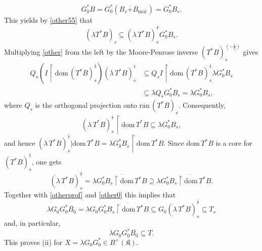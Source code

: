 \documentclass[10pt,a4paper]{amsart}
\makeatletter
\newcommand{\D}{\mathrm{dom}\,}
\newcommand{\adj}{^*}
\newcommand{\half}{^{\frac{1}{2}}}
\newcommand{\halfltsbs}{ (\lambda \,  \tstar B)^{\half}_s }
\newcommand{\halftsbs}{ ( \tstar B)^{\half}_s }
\newcommand{\inclu}{\subseteq}
\newcommand{\kk}{\mathfrak{K}}
\newcommand{\lplusk}{B^{+}(\kk)}
\newcommand{\mul}{\mathrm{mul} \, }
\renewenvironment{proof}[1][\proofname]{%
   \par\pushQED{\qed}\normalfont%
   \topsep6\p@\@plus6\p@\relax
   \trivlist\item[\hskip\labelsep\bfseries#1\@addpunct{.}]%
   \ignorespaces
}{%
   \popQED\endtrivlist\@endpefalse
}
\newcommand{\ranbar}{\overline{\mathrm{ran}}\,}
\newcommand{\rest}{\upharpoonright}
\newcommand{\ts}{T_s}
\newcommand{\tstar}{T^{*}}
\makeatother
\begin{document}
\begin{proof}
       \begin{equation} \label{other0}
         G_0\adj B   = G_0\adj  (B_s  \overset{.}{+} B_{\mul})
                          =    G_0\adj  B_s.
        \end{equation}
            This yields by \eqref{other55} that
                 \begin{equation} \label{other}
                  (\lambda  \tstar B)_s \inclu    \halfltsbs G_0\adj B_s.
                   \end{equation}
        Multiplying \eqref{other} from the left by the Moore-Penrose inverse $  (\tstar B)_s^{(-\frac{1}{2})}$  gives
                 \begin{align*}
                           Q_s (I \rest \D \halftsbs)   \halfltsbs & \inclu   Q_s I \rest \D \halftsbs   \lambda  G_0\adj B_s\\
                                                           & \inclu  \lambda Q_s    G_0\adj B_s = \lambda G_0\adj B_s,
                \end{align*}
               where $Q_s$ is the orthogonal  projection onto $\ranbar (\tstar B)_s.$
               Consequently,
              \begin{equation*}
                \halfltsbs \rest \D \tstar B \inclu \lambda   G_0\adj B_s,
              \end{equation*}
              and hence
              $
                  \halfltsbs| \D \tstar B  = \lambda  G_0\adj B_s \rest \D \tstar B.
              $
             Since $\D \tstar B $ is a core for $ \halftsbs$,   one gets
               \begin{equation*}
               \halfltsbs =   \lambda \overline{G_0\adj B_s \rest \D \tstar B} \supseteq \lambda  G_0\adj \overline{ B_s \rest \D \tstar B}.
              \end{equation*}
              Together with \eqref{otherprof} and \eqref{other0}  this implies that
             \begin{equation}\label{ghayth}
              \lambda G_0 G_0\adj \overline{B_0}= \lambda  G_0 G_0\adj \overline{ B_s \rest \D \tstar B} \inclu  G_0  \halfltsbs \inclu \ts
               \end{equation}
            and, in particular,
              $$
                \lambda G_0 G_0\adj \overline{ B_0} \inclu  T.
                $$
         This proves (ii) for $X=  \lambda  G_0 G_0\adj \in \lplusk.$


\end{proof}
\end{document}
